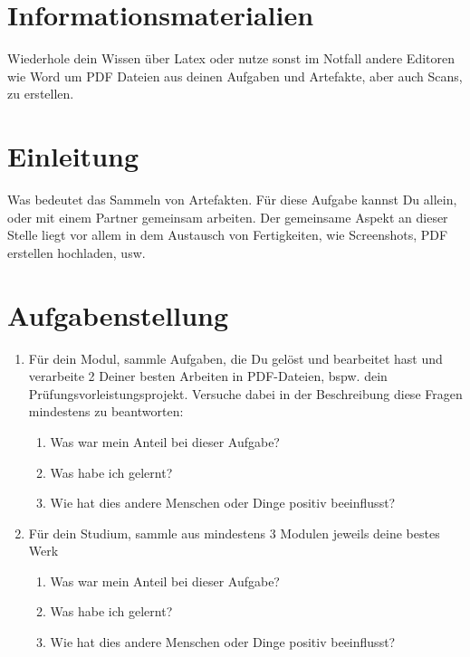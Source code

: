 \documentclass[a4paper,oneside]{scrarticle}
\begin{document}
	\pagebreak 
	
	\section*{Informationsmaterialien}
	
	Wiederhole dein Wissen über Latex oder nutze sonst im Notfall andere Editoren wie Word um PDF Dateien aus deinen Aufgaben und Artefakte, aber auch Scans, zu erstellen.
	
	
	
	
	\pagebreak
	
	\section*{Einleitung}
	Was bedeutet das Sammeln von Artefakten. Für diese Aufgabe kannst Du allein, oder mit einem Partner gemeinsam arbeiten. Der gemeinsame Aspekt an dieser Stelle liegt vor allem in dem Austausch von Fertigkeiten, wie Screenshots, PDF erstellen hochladen, usw.
	
	\section*{Aufgabenstellung}

	\begin{enumerate}
		\item Für dein Modul, sammle Aufgaben, die Du gelöst und bearbeitet hast und verarbeite 2 Deiner besten Arbeiten in PDF-Dateien, bspw. dein Prüfungsvorleistungsprojekt. Versuche dabei in der Beschreibung diese Fragen mindestens zu beantworten:
		\begin{enumerate}
			\item Was war mein Anteil bei dieser Aufgabe?
			\item Was habe ich gelernt?
			\item Wie hat dies andere Menschen oder Dinge positiv beeinflusst?
		\end{enumerate}
		\item Für dein Studium, sammle aus mindestens 3 Modulen jeweils deine bestes Werk
		\begin{enumerate}
			\item Was war mein Anteil bei dieser Aufgabe?
			\item Was habe ich gelernt?
			\item Wie hat dies andere Menschen oder Dinge positiv beeinflusst?
		\end{enumerate}

	\end{enumerate}
\end{document}
